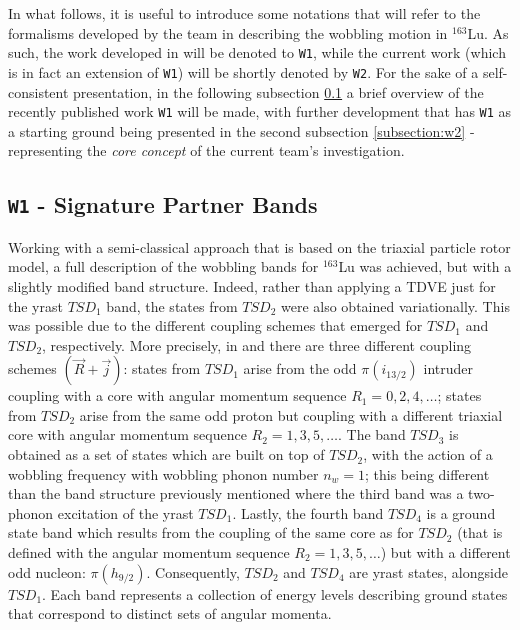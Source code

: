 \documentclass[11pt]{article}
\begin{document}
In what follows, it is useful to introduce some notations that will refer to the formalisms developed by the team in describing the wobbling motion in $^{163}$Lu. As such, the work developed in \cite{raduta2020approach,raduta2020towards} will be denoted to \texttt{W1}, while the current work (which is in fact an extension of \texttt{W1}) will be shortly denoted by \texttt{W2}. For the sake of a self-consistent presentation, in the following subsection \ref{subsection:w1} a brief overview of the recently published work \texttt{W1} will be made, with further development that has \texttt{W1} as a starting ground being presented in the second subsection \ref{subsection:w2} - representing the \emph{core concept} of the current team's investigation.

\subsection{\texttt{W1} - Signature Partner Bands}
\label{subsection:w1}

Working with a semi-classical approach that is based on the triaxial particle rotor model, a full description of the wobbling bands for $^{163}$Lu was achieved, but with a slightly modified band structure. Indeed, rather than applying a TDVE just for the yrast $TSD_1$ band, the states from $TSD_2$ were also obtained variationally. This was possible due to the different coupling schemes that emerged for $TSD_1$ and $TSD_2$, respectively. More precisely, in \cite{raduta2020towards} and \cite{raduta2020approach} there are three different coupling schemes $(\vec{R}+\vec{j})$: states from $TSD_1$ arise from the odd $\pi(i_{13/2})$ intruder coupling with a core with angular momentum sequence $R_1=0,2,4,\dots$; states from $TSD_2$ arise from the same odd proton but coupling with a different triaxial core with angular momentum sequence $R_2=1,3,5,\dots$. The band $TSD_3$ is obtained as a set of states which are built on top of $TSD_2$, with the action of a wobbling frequency with wobbling phonon number $n_w=1$; this being different than the band structure previously mentioned where the third band was a two-phonon excitation of the yrast $TSD_1$. Lastly, the fourth band $TSD_4$ is a ground state band which results from the coupling of the same core as for $TSD_2$ (that is defined with the angular momentum sequence $R_2=1,3,5,\dots$) but with a different odd nucleon: $\pi(h_{9/2})$. Consequently, $TSD_2$ and $TSD_4$ are yrast states, alongside $TSD_1$. Each band represents a collection of energy levels describing ground states that correspond to distinct sets of angular momenta.
\end{document}
